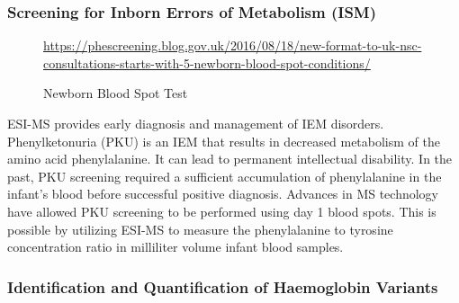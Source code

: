 \documentclass[letterpaper, 10 pt, conference]{ieeeconf}  %
\begin{document}
            \subsubsection[\textbf{Screeing for Inborn Errors of Metabolism}]{\textbf{Screening for Inborn Errors of Metabolism (ISM)}}\hfill

            \begin{figure}[h]
                \centering
            
                \caption{Newborn Blood Spot Test}
                \tiny{\url{https://phescreening.blog.gov.uk/2016/08/18/new-format-to-uk-nsc-consultations-starts-with-5-newborn-blood-spot-conditions/}}
            \end{figure}

            ESI-MS provides early diagnosis and management of IEM disorders. Phenylketonuria (PKU) is an IEM that results in decreased metabolism of the amino acid phenylalanine. It can lead to permanent intellectual disability. In the past, PKU screening required a sufficient accumulation of phenylalanine in the infant's blood before successful positive diagnosis. Advances in MS technology have allowed PKU screening to be performed using day 1 blood spots. This is possible by utilizing ESI-MS to measure the phenylalanine to tyrosine concentration ratio in milliliter volume infant blood samples.

           \subsubsection{\textbf{Identification and Quantification of Haemoglobin Variants}}\hfill
\end{document}

